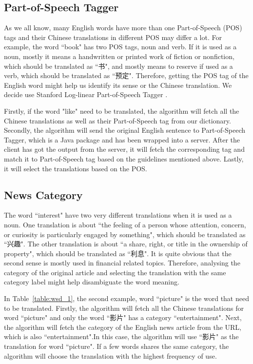 \begin{CJK}{UTF8}{gbsn}
\subsection{Part-of-Speech Tagger}
As we all know, many English words have more than one Part-of-Speech (POS) tags and their Chinese translations in different POS may differ a lot. For example, the word ``book" has two POS tags, noun and verb. If it is used as a noun, mostly it means a handwritten or printed work of fiction or nonfiction, which should be translated as ``书", and mostly means to reserve if used as a verb, which should be translated as ``预定". Therefore, getting the POS tag of the English word might help us identify its sense or the Chinese translation. We decide use Stanford Log-linear Part-of-Speech Tagger \cite{Toutanova2003}.

Firstly, if the word "like" need to be translated, the algorithm will fetch all the Chinese translations as well as their Part-of-Speech tag from our dictionary. Secondly, the algorithm will send the original English sentence to Part-of-Speech Tagger, which is a Java package and has been wrapped into a server. After the client has got the output from the server, it will fetch the corresponding tag and match it to Part-of-Speech tag based on the guidelines mentioned above. Lastly, it will select the translations based on the POS.

\subsection{News Category}
The word ``interest" have two very different translations when it is used as a noun. One translation is about ``the feeling of a person whose attention, concern, or curiosity is particularly engaged by something", which should be translated as ``兴趣". The other translation is about ``a share, right, or title in the ownership of property", which should be translated as ``利息". It is quite obvious that the second sense is mostly used in financial related topics. Therefore, analysing the category of the original article and selecting the translation with the same category label might help disambiguate the word meaning.

In Table~\ref{table:wsd_1}, the second example, word ``picture" is the word that need to be translated. Firstly, the algorithm will fetch all the Chinese translations for word ``picture" and only the word ``影片" has a category ``entertainment". Next, the algorithm will fetch the category of the English news article from the URL, which is also ``entertainment".In this case, the algorithm will use ``影片" as the translation for word ``picture". If a few words shares the same category, the algorithm will choose the translation with the highest frequency of use.


\end{CJK}
